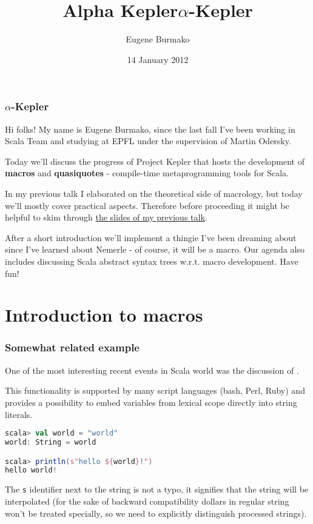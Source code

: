 \documentclass[hyperref={bookmarks=false}]{beamer}
\title{Alpha Kepler}
\begin{document}
\title{$\alpha$-Kepler}
\author{Eugene Burmako}
\date{14 January 2012}
\maketitle

\begin{frame}[t,fragile]
\frametitle{$\alpha$-Kepler}

Hi folks! My name is Eugene Burmako, since the last fall I've been working in Scala Team and studying at EPFL under the supervision of Martin Odersky.

Today we'll discuss the progress of Project Kepler that hosts the development of \textbf{macros} and \textbf{quasiquotes} - compile-time metaprogramming tools for Scala.

In my previous talk I elaborated on the theoretical side of macrology, but today we'll mostly cover practical aspects. Therefore before proceeding it might be helpful to skim through {\color{linkblue}\href{http://scalamacros.org/talks/2011-10-18-WhatsUp.pdf}{the slides of my previous talk}}.

After a short introduction we'll implement a thingie I've been dreaming about since I've learned about Nemerle - of course, it will be a macro. Our agenda also includes discussing Scala abstract syntax trees w.r.t. macro development. Have fun!
\end{frame}

\section{Introduction to macros}

\begin{frame}[t,fragile]
\frametitle{Somewhat related example}

One of the most interesting recent events in Scala world was the discussion of .

This functionality is supported by many script languages (bash, Perl, Ruby) and provides a possibility to embed variables from lexical scope directly into string literals.

\begin{lstlisting}[language=scala]
scala> val world = "world"
world: String = world

scala> println(s"hello ${world}!")
hello world!
\end{lstlisting}%

The \texttt{s} identifier next to the string is not a typo, it signifies that the string will be interpolated (for the sake of backward compatibility dollars in regular string won't be treated specially, so we need to explicitly distinguish processed strings).
\end{frame}
\end{document}
